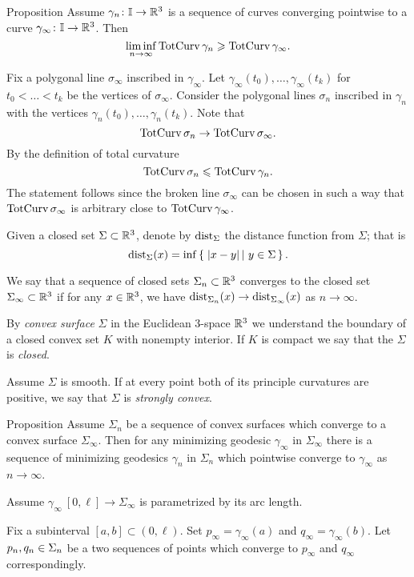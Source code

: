\documentclass[a4paper,10pt]{amsart}
\begin{document}
\begin{thm}{Proposition}\label{prop:semicontinuity}
Assume $\gamma_n\colon\mathbb{I}\to\mathbb{R}^3$ is a sequence of curves  converging pointwise to a curve $\gamma_\infty\colon\mathbb{I}\to\mathbb{R}^3$.
Then 
\[\liminf_{n\to\infty}\mathop{\rm TotCurv}\nolimits\gamma_n\geqslant \mathop{\rm TotCurv}\nolimits\gamma_\infty.\]
\end{thm}


Fix a polygonal line $\sigma_\infty$ inscribed in $\gamma_\infty$.
Let $\gamma_\infty(t_0),\dots,\gamma_\infty(t_k)$
for $t_0<\dots<t_k$
be the vertices of $\sigma_\infty$.
Consider the polygonal lines $\sigma_n$ inscribed in $\gamma_n$ with the vertices 
$\gamma_n(t_0),\dots,\gamma_n(t_k)$.
Note that 
\[\mathop{\rm TotCurv}\nolimits\sigma_n\to\mathop{\rm TotCurv}\nolimits\sigma_\infty.\]
By the definition of total curvature 
\[\mathop{\rm TotCurv}\nolimits\sigma_n\leqslant\mathop{\rm TotCurv}\nolimits\gamma_n.\]
The statement follows since the broken line $\sigma_\infty$ can be chosen in such a way that 
$\mathop{\rm TotCurv}\nolimits\sigma_\infty$ is arbitrary close to $\mathop{\rm TotCurv}\nolimits\gamma_\infty$.
\qeds

Given a closed set $\Sigma\subset \mathbb{R}^3$,
denote by $\operatorname{dist}_\Sigma$ the distance function from $\Sigma$;
that is 
\[\dist_\Sigma(x)=\inf\set{|x-y|}{y\in\Sigma}.\]

We say that a sequence of closed sets $\Sigma_n\subset \mathbb{R}^3$
converges to the closed set $\Sigma_\infty\subset \mathbb{R}^3$ 
if for any $x\in\mathbb{R}^3$,
we have
$\operatorname{dist}_{\Sigma_n}(x)\to\operatorname{dist}_{\Sigma_\infty}(x)$ as $n\to\infty$.


By \emph{convex surface} $\Sigma$ in the Euclidean 3-space $\mathbb{R}^3$ we understand the boundary of a closed convex set $K$ with nonempty interior.
If $K$ is compact we say that the $\Sigma$ is \emph{closed}.

Assume $\Sigma$ is smooth.
If at every point both of its principle curvatures are positive, we say that $\Sigma$ is \emph{strongly convex}. 

\begin{thm}{Proposition}\label{prop:convegence}
Assume $\Sigma_n$ be a sequence of convex surfaces which converge to a convex surface $\Sigma_\infty$.
Then for any minimizing geodesic $\gamma_\infty$ in $\Sigma_\infty$ there is a sequence of minimizing geodesics $\gamma_n$ in $\Sigma_n$ which pointwise converge to $\gamma_\infty$ as $n\to \infty$.
\end{thm}

Assume $\gamma_\infty\:[0,\ell]\to\Sigma_\infty$ is parametrized by its arc length.

Fix a subinterval $[a,b]\subset (0,\ell)$.
Set $p_\infty=\gamma_\infty(a)$ and $q_\infty=\gamma_\infty(b)$.
Let $p_n,q_n\zz\in\Sigma_n$ be a two sequences of points which converge to $p_\infty$ and $q_\infty$ 
correspondingly.
\end{document}

